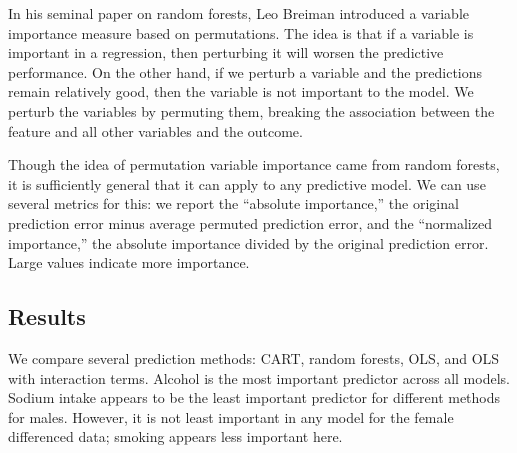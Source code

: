 \documentclass[11pt]{article}\usepackage[]{graphicx}\usepackage[]{color}
\begin{document}
In his seminal paper on random forests, Leo Breiman introduced a variable importance measure based on permutations. 
The idea is that if a variable is important in a regression, then perturbing it will worsen the predictive performance. 
On the other hand, if we perturb a variable and the predictions remain relatively good, then the variable is not important to the model. 
We perturb the variables by permuting them, breaking the association between the feature and all other variables and the outcome.

Though the idea of permutation variable importance came from random forests, it is sufficiently general that it can apply to any predictive model. 
We can use several metrics for this: 
we report the ``absolute importance,'' the original prediction error minus average permuted prediction error, and the ``normalized importance,'' the absolute importance divided by the original prediction error. 
Large values indicate more importance.

\subsection{Results}
We compare several prediction methods: CART, random forests, OLS, and OLS with interaction terms.
Alcohol is the most important predictor across all models.
Sodium intake appears to be the least important predictor for different methods for males. 
However, it is not least important in any model for the female differenced data; smoking appears less important here.
\end{document}
